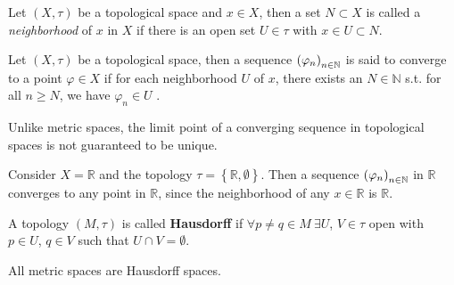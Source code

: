 \begin{defn}
	Let $(X, \tau)$ be a topological space and $x\in X$, then a set $N\subset X$ is called a \textit{neighborhood} of $x$ in $X$ if there is an open set $U\in\tau$ with $x\in U\subset N$.
\end{defn}

\begin{defn}
	Let $(X, \tau)$ be a topological space, then a sequence $\seq[\varphi_n]$ is said to converge to a point $\varphi\in X$ if for each neighborhood $U$ of $x$, there exists an $N\in\mathbb N$ s.t. for all $n\geq N$, we have $\varphi_n\in U$ \cite{289740}.
\end{defn}

\begin{remark}
	Unlike metric spaces, the limit point of a converging sequence in topological spaces is not guaranteed to be unique.
\end{remark}

\begin{exmp}
	Consider $X = \mathbb R$ and the topology $\tau = \left\{\mathbb R, \emptyset\right\}$. Then a sequence $\seq[\varphi_n]$ in $\mathbb R$ converges to any point in $\mathbb R$, since the neighborhood of any $x\in \mathbb R$ is $\mathbb R$.
\end{exmp}

\begin{defn}[Hausdorff]
	A topology $\left(M, \tau\right)$ is called \textbf{Hausdorff} if $\forall p\ne q \in M \ \exists U$, $V\in \tau$ open with $p\in U$, $q\in V$ such that $U\cap V = \emptyset$.  
\end{defn} 

\begin{lemma}
	All metric spaces are Hausdorff spaces. 
\end{lemma}

